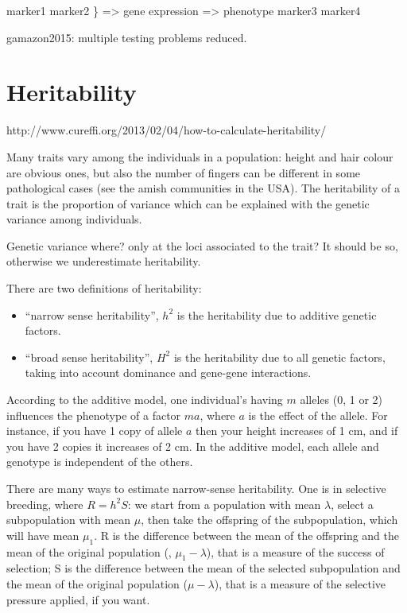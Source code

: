 \documentclass[../main.tex]{subfiles}
\begin{document}
marker1
marker2
			\} => gene expression => phenotype
marker3
marker4

gamazon2015: multiple testing problems reduced.

\section{Heritability}

http://www.cureffi.org/2013/02/04/how-to-calculate-heritability/

Many traits vary among the individuals in a population: height and hair 
colour are obvious ones, but also the number of fingers can be different 
in some pathological cases (see the amish communities in the USA). The 
heritability of a trait is the proportion of variance which can be 
explained with the genetic variance among individuals.

Genetic variance where? only at the loci associated to the trait? It 
should be so, otherwise we underestimate heritability.

There are two definitions of heritability:

\begin{itemize}
	\item \enquote{narrow sense heritability}, $h^2$ is the heritability 
		due to additive genetic factors.
	\item \enquote{broad sense heritability}, $H^2$ is the heritability 
		due to all genetic factors, taking into account dominance and 
		gene-gene interactions.
\end{itemize}

According to the additive model, one individual's having $m$ alleles (0, 
1 or 2) influences the phenotype of a factor $m a$, where $a$ is the 
  effect of the allele. For instance, if you have 1 copy of allele $a$ 
then your height increases of 1 cm, and if you have 2 copies it 
increases of 2 cm. In the additive model, each allele and genotype is 
independent of the others.

There are many ways to estimate narrow-sense heritability. One is in 
selective breeding, where $R = h^2 S$: we start from a population with 
mean $\lambda$, select a subpopulation with mean $\mu$, then take the 
offspring of the subpopulation, which will have mean $\mu_1$. R is the 
difference between the mean of the offspring and the mean of the 
original population (\ie, $\mu_1 - \lambda$), that is a measure of the 
success of selection; S is the difference between the mean of the 
selected subpopulation and the mean of the original population (\ie $\mu 
- \lambda$), that is a measure of the selective pressure applied, if you 
want.
\end{document}
